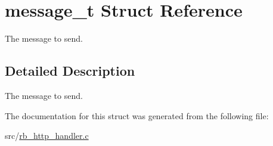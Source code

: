 \hypertarget{structmessage__t}{\section{message\-\_\-t Struct Reference}
\label{structmessage__t}
}


The message to send.  




\subsection{Detailed Description}
The message to send. 

The documentation for this struct was generated from the following file\-:\begin{DoxyCompactItemize}
\item 
src/\hyperlink{rb__http__handler_8c}{rb\-\_\-http\-\_\-handler.\-c}\end{DoxyCompactItemize}
